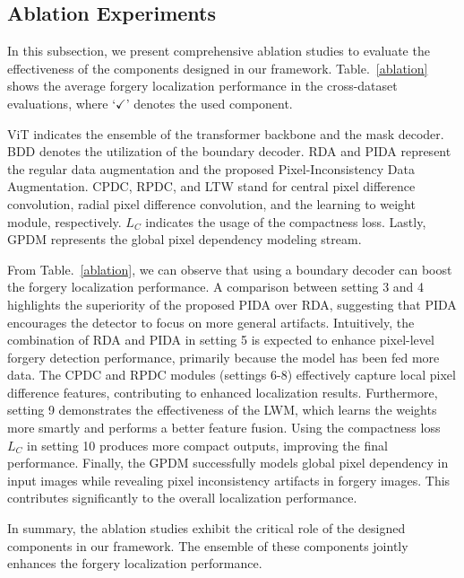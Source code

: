 \documentclass[10pt,journal,compsoc]{IEEEtran}
\begin{document}




\subsection{Ablation Experiments} 
In this subsection, we present comprehensive ablation studies to evaluate the effectiveness of the components designed in our framework. Table.~\ref{ablation} shows the average forgery localization performance in the cross-dataset evaluations, where `$\checkmark$' denotes the used component. 

ViT indicates the ensemble of the transformer backbone and the mask decoder. BDD denotes the utilization of the boundary decoder. RDA and PIDA represent the regular data augmentation and the proposed Pixel-Inconsistency Data Augmentation. CPDC, RPDC, and LTW stand for central pixel difference convolution, radial pixel difference convolution, and the learning to weight module, respectively. $L_{C}$ indicates the usage of the compactness loss. Lastly, GPDM represents the global pixel dependency modeling stream.

From Table.~\ref{ablation}, we can observe that using a boundary decoder can boost the forgery localization performance. A comparison between setting 3 and 4 highlights the superiority of the proposed PIDA over RDA, suggesting that PIDA encourages the detector to focus on more general artifacts. Intuitively, the combination of RDA and PIDA in setting 5 is expected to enhance pixel-level forgery detection performance, primarily because the model has been fed more data.
The CPDC and RPDC modules (settings 6-8) effectively capture local pixel difference features, contributing to enhanced localization results. Furthermore, setting 9 demonstrates the effectiveness of the LWM, which learns the weights more smartly and performs a better feature fusion. Using the compactness loss $L_C$ in setting 10 produces more compact outputs, improving the final performance. Finally, the GPDM successfully models global pixel dependency in input images while revealing pixel inconsistency artifacts in forgery images. This contributes significantly to the overall localization performance. 

In summary, the ablation studies exhibit the critical role of the designed components in our framework. The ensemble of these components jointly enhances the forgery localization performance.
\end{document}
